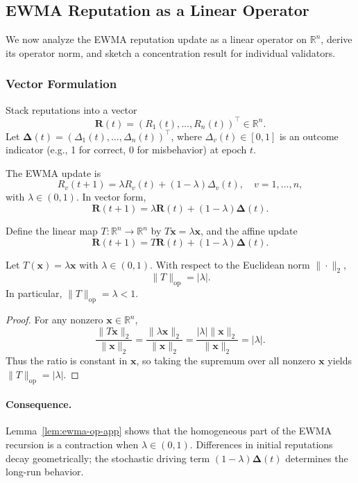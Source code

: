\documentclass[11pt]{article}
\begin{document}
\subsection{EWMA Reputation as a Linear Operator}

We now analyze the EWMA reputation update as a linear operator on \(\mathbb{R}^n\), derive its operator norm, and sketch a concentration result for individual validators.

\subsubsection{Vector Formulation}

Stack reputations into a vector
\[
\bm{R}(t) = (R_1(t),\dots,R_n(t))^\top \in \mathbb{R}^n.
\]
Let \(\bm{\Delta}(t) = (\Delta_1(t),\dots,\Delta_n(t))^\top\), where \(\Delta_v(t) \in [0,1]\) is an outcome indicator (e.g., 1 for correct, 0 for misbehavior) at epoch \(t\).

The EWMA update is
\[
R_v(t+1) = \lambda R_v(t) + (1-\lambda)\Delta_v(t), \quad v = 1,\dots,n,
\]
with \(\lambda \in (0,1)\). In vector form,
\[
\bm{R}(t+1) = \lambda \bm{R}(t) + (1-\lambda)\bm{\Delta}(t).
\]

Define the linear map \(T:\mathbb{R}^n \to \mathbb{R}^n\) by \(T\bm{x} = \lambda \bm{x}\), and the affine update
\[
\bm{R}(t+1) = T\bm{R}(t) + (1-\lambda)\bm{\Delta}(t).
\]

\begin{lemma}
\label{lem:ewma-op-app}
Let \(T(\bm{x}) = \lambda \bm{x}\) with \(\lambda \in (0,1)\). With respect to the Euclidean norm \(\|\cdot\|_2\),
\[
\|T\|_{\mathrm{op}} = |\lambda|.
\]
In particular, \(\|T\|_{\mathrm{op}} = \lambda < 1\).
\end{lemma}

\begin{proof}
For any nonzero \(\bm{x} \in \mathbb{R}^n\),
\[
\frac{\|T\bm{x}\|_2}{\|\bm{x}\|_2}
= \frac{\|\lambda \bm{x}\|_2}{\|\bm{x}\|_2}
= \frac{|\lambda|\|\bm{x}\|_2}{\|\bm{x}\|_2}
= |\lambda|.
\]
Thus the ratio is constant in \(\bm{x}\), so taking the supremum over all nonzero \(\bm{x}\) yields \(\|T\|_{\mathrm{op}} = |\lambda|\).
\end{proof}

\paragraph{Consequence.}
Lemma~\ref{lem:ewma-op-app} shows that the homogeneous part of the EWMA recursion is a contraction when \(\lambda \in (0,1)\). Differences in initial reputations decay geometrically; the stochastic driving term \((1-\lambda)\bm{\Delta}(t)\) determines the long-run behavior.
\end{document}
